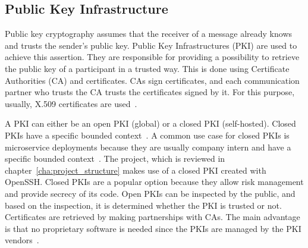 \subsection{Public Key Infrastructure} \label{sec:pki}
Public key cryptography assumes that the receiver of a message already knows and trusts the sender's public key.
Public Key Infrastructures (PKI) are used to achieve this assertion.
They are responsible for providing a possibility to retrieve the public key of a participant in a trusted way.
This is done using Certificate Authorities (CA) and certificates.
CAs sign certificates, and each communication partner who trusts the CA trusts the certificates signed by it.
For this purpose, usually, X.509 certificates are used~\cite{anderson2020security}.

A PKI can either be an open PKI (global) or a closed PKI (self-hosted).
Closed PKIs have a specific bounded context~\cite{hlavaty2003risk}.
A common use case for closed PKIs is microservice deployments because they are usually company intern and have a specific bounded context~\cite{dias2020microservices}.
The project, which is reviewed in chapter~\ref{cha:project_structure} makes use of a closed PKI created with OpenSSH.
Closed PKIs are a popular option because they allow risk management and provide secrecy of its code.
Open PKIs can be inspected by the public, and based on the inspection, it is determined whether the PKI is trusted or not.
Certificates are retrieved by making partnerships with CAs.
The main advantage is that no proprietary software is needed since the PKIs are managed by the PKI vendors~\cite{hlavaty2003risk}.

